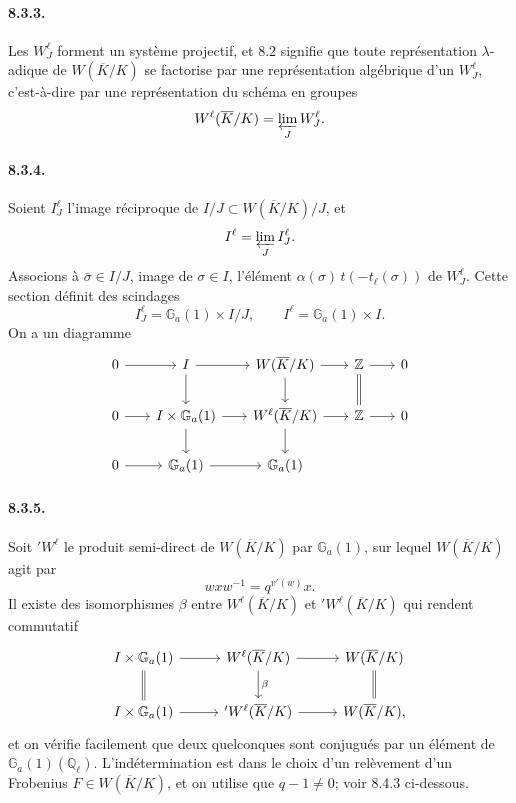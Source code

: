 \documentclass[10pt]{article}
\newcommand{\Z}{\mathbb Z}
\begin{document}
\paragraph{8.3.3.} Les \(W_J^\ell\) forment un système projectif, et 8.2 signifie que toute représentation \(\lambda\)-adique de \(W(\overline K/K)\) se factorise par une représentation algébrique d'un \(W_J^\ell\), c'est-à-dire par une représentation du schéma en groupes
\[
W^\ell(\overline K/K)=\varprojlim_J W_J^\ell.
\]

\paragraph{8.3.4.} Soient \(I_J^\ell\) l'image réciproque de \(I/J\subset W(\overline K/K)/J\), et
\[
I^\ell=\varprojlim_J I_J^\ell.
\]
Associons à \(\bar\sigma\in I/J\), image de \(\sigma\in I\), l'élément \(\alpha(\sigma)\,t(-t_\ell(\sigma))\) de \(W_J^\ell\). Cette section définit des scindages
\[
I_J^\ell=\mathbb G_a(1)\times I/J,
\qquad
I^\ell=\mathbb G_a(1)\times I.
\]
On a un diagramme
\[
\begin{tikzcd}[column sep=1.8em,row sep=1.8em]
0 \arrow[r] & I \arrow[r] \arrow[d] & W(\overline K/K) \arrow[r] \arrow[d] & \Z \arrow[r] \arrow[d,equal] & 0\\
0 \arrow[r] & I\times\mathbb G_a(1) \arrow[r] \arrow[d] & W^\ell(\overline K/K) \arrow[r] \arrow[d] & \Z \arrow[r] & 0\\
0 \arrow[r] & \mathbb G_a(1) \arrow[r] & \mathbb G_a(1) & &
\end{tikzcd}
\]

\paragraph{8.3.5.} Soit \({}'W^\ell\) le produit semi-direct de \(W(\overline K/K)\) par \(\mathbb G_a(1)\), sur lequel \(W(\overline K/K)\) agit par
\[
w x w^{-1}=q^{v'(w)}x.
\]
Il existe des isomorphismes \(\beta\) entre \(W^\ell(\overline K/K)\) et \({}'W^\ell(\overline K/K)\) qui rendent commutatif
\[
\begin{tikzcd}[column sep=2.8em,row sep=2.0em]
I\times\mathbb G_a(1)\arrow[r]\arrow[d,equal]&
W^\ell(\overline K/K)\arrow[r]\arrow[d,"\beta"]&
W(\overline K/K)\arrow[d,equal]\\
I\times\mathbb G_a(1)\arrow[r]&
{}'W^\ell(\overline K/K)\arrow[r]&
W(\overline K/K),
\end{tikzcd}
\]
et on vérifie facilement que deux quelconques sont conjugués par un élément de \(\mathbb G_a(1)(\mathbb Q_\ell)\). L'indétermination est dans le choix d'un relèvement d'un Frobenius \(F\in W(\overline K/K)\), et on utilise que \(q-1\ne0\); voir 8.4.3 ci-dessous.
\end{document}
